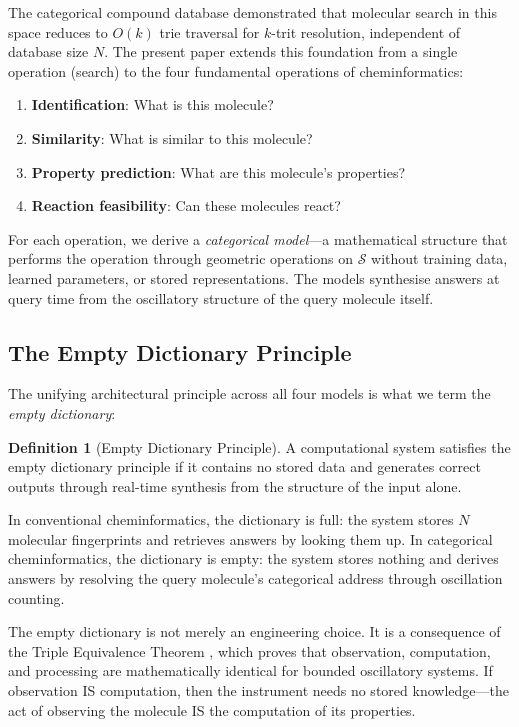 \documentclass[11pt,twocolumn,a4paper]{article}
\theoremstyle{definition}
\newtheorem{definition}[theorem]{Definition}
\theoremstyle{remark}
\newcommand{\Sspace}{\mathcal{S}}
\begin{document}
The categorical compound database \citep{sachikonye2025c} demonstrated that molecular search in this space reduces to $O(k)$ trie traversal for $k$-trit resolution, independent of database size $N$. The present paper extends this foundation from a single operation (search) to the four fundamental operations of cheminformatics:

\begin{enumerate}[nosep]
\item \textbf{Identification}: What is this molecule?
\item \textbf{Similarity}: What is similar to this molecule?
\item \textbf{Property prediction}: What are this molecule's properties?
\item \textbf{Reaction feasibility}: Can these molecules react?
\end{enumerate}

For each operation, we derive a \emph{categorical model}---a mathematical structure that performs the operation through geometric operations on $\Sspace$ without training data, learned parameters, or stored representations. The models synthesise answers at query time from the oscillatory structure of the query molecule itself.

\subsection{The Empty Dictionary Principle}

The unifying architectural principle across all four models is what we term the \emph{empty dictionary}:

\begin{definition}[Empty Dictionary Principle]
\label{def:empty_dict}
A computational system satisfies the empty dictionary principle if it contains no stored data and generates correct outputs through real-time synthesis from the structure of the input alone.
\end{definition}

In conventional cheminformatics, the dictionary is full: the system stores $N$ molecular fingerprints and retrieves answers by looking them up. In categorical cheminformatics, the dictionary is empty: the system stores nothing and derives answers by resolving the query molecule's categorical address through oscillation counting.

The empty dictionary is not merely an engineering choice. It is a consequence of the Triple Equivalence Theorem \citep{sachikonye2025a}, which proves that observation, computation, and processing are mathematically identical for bounded oscillatory systems. If observation IS computation, then the instrument needs no stored knowledge---the act of observing the molecule IS the computation of its properties.
\end{document}
